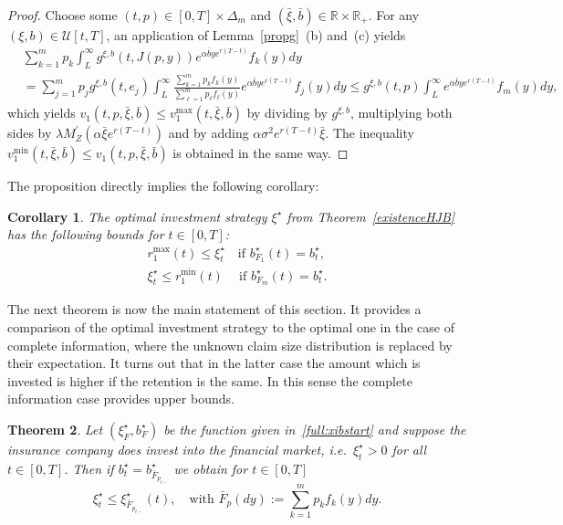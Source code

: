 \documentclass[reqno, 11pt]{amsart}%
\newcommand{\R}{\mathbb{R}}
\newtheorem{theorem}{Theorem}
\newtheorem{corollary}[theorem]{Corollary}
\theoremstyle{definition}
\numberwithin{equation}{section} \numberwithin{theorem}{section}
\begin{document}
\begin{proof}
   Choose some $(t,p)\in[0,T]\times\Delta_m$ and $(\bar\xi,\bar b)\in\R\times\R_+$. For any $(\xi,b)\in\mathcal U[t,T]$, an application of Lemma~\ref{propg}~(b) and~(c) yields
   \begin{align*}
   &\sum_{k=1}^{m}p_k\int_L^\infty g^{\xi,b}(t,J(p,y))e^{\alpha\bar b y e^{r(T-t)}}f_k(y)dy \\
   &= \sum_{j=1}^{m}p_j g^{\xi,b}(t,e_j) \int_L^\infty\frac{\sum_{k=1}^{m}p_kf_k(y)}{\sum_{\ell=1}^{m}p_\ell f_\ell(y)} e^{\alpha \bar b y e^{r(T-t)}}f_j(y)dy 
   \le g^{\xi,b}(t,p) \int_L^\infty e^{\alpha \bar b y e^{r(T-t)}}f_m(y)dy,
   \end{align*}
   which yields $v_1(t,p,\bar\xi,\bar b) \le v_1^{\max}(t,\bar\xi,\bar b)$ by dividing by $ g^{\xi,b}$, multiplying both sides by \linebreak $\lambda M_Z^\prime(\alpha \bar\xi e^{r(T-t)})$ and by adding $\alpha\sigma^2e^{r(T-t)}\bar\xi$.
   The inequality $v_1^{\min}(t,\bar \xi,\bar b) \le v_1(t,p,\bar\xi,\bar b)$ is obtained in the same way.
\end{proof}

The proposition directly implies the following corollary:

\begin{corollary}\label{co:aprioribounds}
   The optimal investment strategy $\xi^\star$ from Theorem~\ref{existenceHJB} has the following bounds for $ t\in[0,T]$:
   \begin{eqnarray*}
   r_1^{\max}(t)  \le \xi^\star_t  \quad\text{if } b^\star_{F_1}(t)=b_t^\star,\\
  \xi^\star_t  \le   r_1^{\min}(t)  \ \quad\text{if } b^\star_{F_m}(t)=b_t^\star.
   \end{eqnarray*}
  
\end{corollary}


 The next theorem is now the main statement of this section. It provides a comparison of the optimal investment strategy to the optimal one in the case of complete information, where the unknown claim size distribution is replaced by their expectation. It turns out that in the latter case the amount which is invested is higher if the retention is the same. In this sense the complete information case provides upper bounds.
 
\begin{theorem}\label{th:comparison}
   Let $(\xi_F^\star,b_F^\star)$ be the function given in~\eqref{full:xibstart} and suppose the insurance company does invest into the financial market, i.e.\ $\xi_t^\star >0$ for all $t\in [0,T]$. Then  if $b_t^\star = b^\star_{\bar F_{p_{t-}}}$ we obtain for $t\in[0,T]$
   \begin{equation*}
   \xi_t^\star \le \xi^\star_{\bar F_{p_{t-}}}(t),\quad \mbox{with }  \bar F_p(dy) := \sum_{k=1}^m p_kf_k(y)dy.
   \end{equation*}
\end{theorem}
\end{document}

